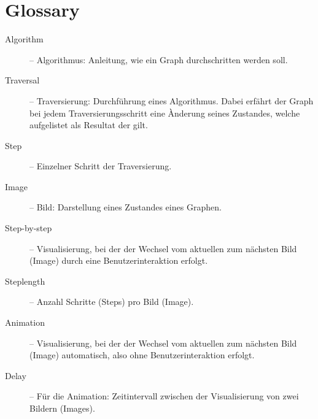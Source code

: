 \section{Glossary}
\label{sec:Glossary}
\begin{description}
  \item[Algorithm] -- Algorithmus: Anleitung, wie ein Graph durchschritten werden soll.
  \item[Traversal] -- Traversierung: Durchf\"uhrung eines Algorithmus. Dabei erf\"ahrt der Graph bei jedem Traversierungsschritt eine \`Anderung seines Zustandes, welche aufgelistet als Resultat der  gilt.
  \item[Step] -- Einzelner Schritt der Traversierung.
  \item[Image] -- Bild: Darstellung eines Zustandes eines Graphen.
  \item[Step-by-step] -- Visualisierung, bei der der Wechsel vom aktuellen zum n\"achsten Bild (Image) durch eine Benutzerinteraktion erfolgt.
  \item[Steplength] -- Anzahl Schritte (Steps) pro Bild (Image).
  \item[Animation] -- Visualisierung, bei der der Wechsel vom aktuellen zum n\"achsten Bild (Image) automatisch, also ohne Benutzerinteraktion erfolgt.
  \item[Delay] -- F\"ur die Animation: Zeitintervall zwischen der Visualisierung von zwei Bildern (Images).
\end{description}